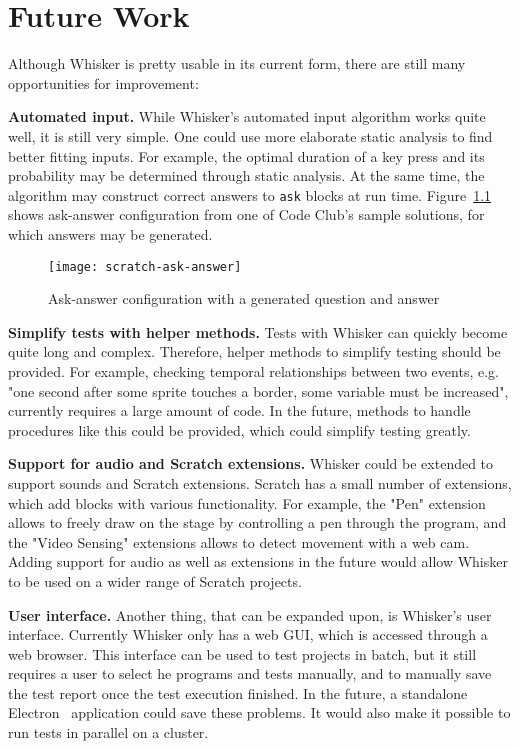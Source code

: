 
\chapter{Future Work}
\label{cha:future_work}

Although Whisker is pretty usable in its current form,
there are still many opportunities for improvement:
\parspace

\textbf{Automated input.}
While Whisker's automated input algorithm works quite well, it is still very simple.
One could use more elaborate static analysis to find better fitting inputs.
For example, the optimal duration of a key press and its probability may be determined through static analysis.
At the same time, the algorithm may construct correct answers to \texttt{ask} blocks at run time.
Figure~\ref{fig:generated_ask_answer} shows ask-answer configuration from one of Code Club's sample solutions,
for which answers may be generated.

\begin{figure}[htpb]
    \centering
    \texttt{[image: scratch-ask-answer]}
    \caption{Ask-answer configuration with a generated question and answer}
    \label{fig:generated_ask_answer}
\end{figure}

\textbf{Simplify tests with helper methods.}
Tests with Whisker can quickly become quite long and complex.
Therefore, helper methods to simplify testing should be provided.
For example, checking temporal relationships between two events,
e.g. "one second after some sprite touches a border, some variable must be increased",
currently requires a large amount of code.
In the future, methods to handle procedures like this could be provided,
which could simplify testing greatly.
\parspace

\textbf{Support for audio and Scratch extensions.}
Whisker could be extended to support sounds and Scratch extensions.
Scratch has a small number of extensions, which add blocks with various functionality.
For example, the "Pen" extension allows to freely draw on the stage by controlling a pen through the program,
and the "Video Sensing" extensions allows to detect movement with a web cam.
Adding support for audio as well as extensions in the future would allow Whisker to be used on a wider range of Scratch projects.
\parspace

\textbf{User interface.}
Another thing, that can be expanded upon, is Whisker's user interface.
Currently Whisker only has a web GUI, which is accessed through a web browser.
This interface can be used to test projects in batch, but it still requires a user to select he programs and tests manually,
and to manually save the test report once the test execution finished.
In the future, a standalone Electron~\cite{electron} application could save these problems.
It would also make it possible to run tests in parallel on a cluster.
